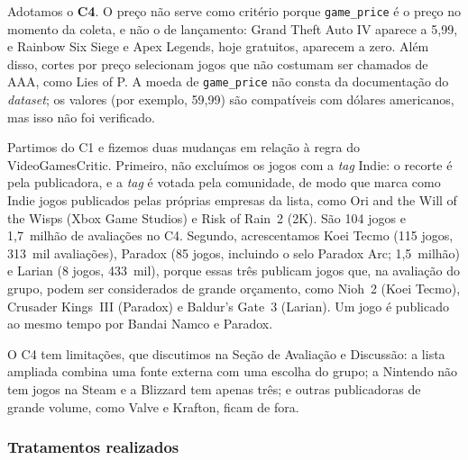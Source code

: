 \documentclass[12pt]{article}
\begin{document}
Adotamos o \textbf{C4}. O preço não serve como critério porque \texttt{game\_price} é o preço no
momento da coleta, e não o de lançamento: Grand Theft Auto IV aparece a 5,99, e Rainbow Six
Siege e Apex Legends, hoje gratuitos, aparecem a zero. Além disso, cortes por preço selecionam
jogos que não costumam ser chamados de AAA, como Lies of P. A moeda de \texttt{game\_price} não
consta da documentação do \textit{dataset}; os valores (por exemplo, 59,99) são compatíveis com
dólares americanos, mas isso não foi verificado.

Partimos do C1 e fizemos duas mudanças em relação à regra do VideoGamesCritic. Primeiro, não
excluímos os jogos com a \textit{tag} Indie: o recorte é pela publicadora, e a \textit{tag} é
votada pela comunidade, de modo que marca como Indie jogos publicados pelas próprias empresas da
lista, como Ori and the Will of the Wisps (Xbox Game Studios) e Risk of Rain~2 (2K). São 104 jogos
e 1,7~milhão de avaliações no C4. Segundo, acrescentamos Koei Tecmo (115 jogos, 313~mil
avaliações), Paradox (85 jogos, incluindo o selo Paradox Arc; 1,5~milhão) e Larian (8 jogos,
433~mil), porque essas três publicam jogos que, na avaliação do grupo, podem ser considerados de grande orçamento, como Nioh~2 (Koei Tecmo), Crusader Kings~III (Paradox) e Baldur's Gate~3 (Larian). Um jogo é publicado ao mesmo tempo
por Bandai Namco e Paradox.

O C4 tem limitações, que discutimos na Seção de Avaliação e Discussão: a lista ampliada combina uma
fonte externa com uma escolha do grupo; a Nintendo não tem jogos na Steam e a Blizzard tem apenas
três; e outras publicadoras de grande volume, como Valve e Krafton, ficam de fora.

\subsubsection{Tratamentos realizados}
\end{document}
